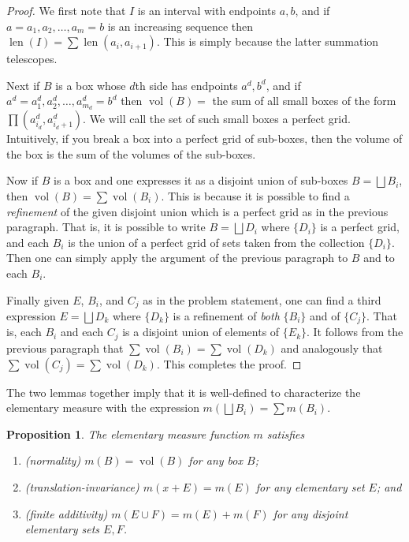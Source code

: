 \documentclass[11pt,oneside]{amsbook}
\DeclareMathOperator{\len}{len}
\DeclareMathOperator{\vol}{vol}
\theoremstyle{definition}
\theoremstyle{plain}
\newtheorem{prop}[thm]{Proposition}
\theoremstyle{definition}
\theoremstyle{remark}
\numberwithin{equation}{section}
\numberwithin{figure}{section}
\begin{document}
\begin{proof}
  We first note that $I$ is an interval with endpoints $a,b$, and if $a=a_1,a_2,\ldots,a_m=b$ is an increasing sequence then $\len(I)=\sum\len(a_i,a_{i+1})$. This is simply because the latter summation telescopes.

  Next if $B$ is a box whose $d$th side has endpoints $a^d,b^d$, and if $a^d=a_1^d,a_2^d,\ldots,a_{m_d}^d=b^d$ then $\vol(B)=$ the sum of all small boxes of the form $\prod(a_{i_d}^d,a_{i_d+1}^d)$. We will call the set of such small boxes a perfect grid. Intuitively, if you break a box into a perfect grid of sub-boxes, then the volume of the box is the sum of the volumes of the sub-boxes.

  Now if $B$ is a box and one expresses it as a disjoint union of sub-boxes $B=\bigsqcup B_i$, then $\vol(B)=\sum\vol(B_i)$. This is because it is possible to find a \emph{refinement} of the given disjoint union which is a perfect grid as in the previous paragraph. That is, it is possible to write $B=\bigsqcup D_i$ where $\{D_i\}$ is a perfect grid, and each $B_i$ is the union of a perfect grid of sets taken from the collection $\{D_i\}$. Then one can simply apply the argument of the previous paragraph to $B$ and to each $B_i$.

  Finally given $E$, $B_i$, and $C_j$ as in the problem statement, one can find a third expression $E=\bigsqcup D_k$ where $\{D_k\}$ is a refinement of \emph{both} $\{B_i\}$ and of $\{C_j\}$. That is, each $B_i$ and each $C_j$ is a disjoint union of elements of $\{E_k\}$. It follows from the previous paragraph that $\sum\vol(B_i)=\sum\vol(D_k)$ and analogously that $\sum\vol(C_j)=\sum\vol(D_k)$. This completes the proof.
\end{proof}

The two lemmas together imply that it is well-defined to characterize the elementary measure with the expression $m(\bigsqcup B_i)=\sum m(B_i)$.

\begin{prop}
  The elementary measure function $m$ satisfies
  \begin{enumerate}
  \item (normality) $m(B)=\vol(B)$ for any box $B$;
  \item (translation-invariance) $m(x+E)=m(E)$ for any elementary set $E$; and
  \item (finite additivity) $m(E\cup F)=m(E)+m(F)$ for any disjoint elementary sets $E,F$.
  \end{enumerate}
\end{prop}
\end{document}
